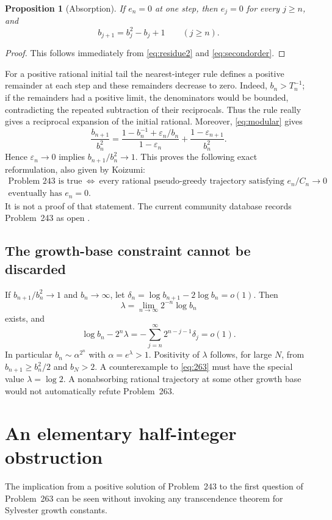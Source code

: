 \documentclass[11pt,a4paper]{article}
\newtheorem{proposition}[theorem]{Proposition}
\theoremstyle{remark}\newtheorem{remark}[theorem]{Remark}
\begin{document}
\begin{proposition}[Absorption]\label{prop:absorb}
If $e_n=0$ at one step, then $e_j=0$ for every $j\ge n$, and
\[
 b_{j+1}=b_j^2-b_j+1\qquad(j\ge n).
\]
\end{proposition}
\begin{proof}
This follows immediately from \eqref{eq:residue2} and
\eqref{eq:secondorder}.
\end{proof}

For a positive rational initial tail the nearest-integer rule defines a
positive remainder at each step and these remainders decrease to zero.
Indeed, $b_n>T_n^{-1}$; if the remainders had a positive limit, the denominators
would be bounded, contradicting the repeated subtraction of their reciprocals.
Thus the rule really gives a reciprocal expansion of the initial rational.
Moreover, \eqref{eq:modular} gives
\[
 \frac{b_{n+1}}{b_n^2}
 =\frac{1-b_n^{-1}+\varepsilon_n/b_n}{1-\varepsilon_n}
       +\frac{1-\varepsilon_{n+1}}{b_n^2}.
\]
Hence $\varepsilon_n\to0$ implies $b_{n+1}/b_n^2\to1$.
This proves the following exact reformulation, also given by Koizumi:
\[
 \begin{gathered}
 \text{Problem 243 is true}\
 \Longleftrightarrow\
 \text{every rational pseudo-greedy trajectory satisfying }e_n/C_n\to0\\
           \text{eventually has }e_n=0.
 \end{gathered}
\]
It is not a proof of that statement. The current community database records
Problem~243 as open \cite{database}.

\subsection{The growth-base constraint cannot be discarded}
If $b_{n+1}/b_n^2\to1$ and $b_n\to\infty$, let
$\delta_n=\log b_{n+1}-2\log b_n=o(1)$. Then
\[
 \lambda=\lim_{n\to\infty}2^{-n}\log b_n
\]
exists, and
\begin{equation}\label{eq:basetail}
 \log b_n-2^n\lambda
   =-\sum_{j=n}^{\infty}2^{n-j-1}\delta_j=o(1).
\end{equation}
In particular $b_n\sim\alpha^{2^n}$ with $\alpha=e^\lambda>1$.
Positivity of $\lambda$ follows, for large $N$, from
$b_{n+1}\ge b_n^2/2$ and $b_N>2$.
A counterexample to \eqref{eq:263} must have the special value
$\lambda=\log2$. A nonabsorbing rational trajectory at some other growth base
would not automatically refute Problem~263.

\section{An elementary half-integer obstruction}
The implication from a positive solution of Problem~243 to the first question
of Problem~263 can be seen without invoking any transcendence theorem for
Sylvester growth constants.
\end{document}

